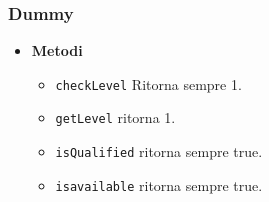 \subsubsection{Dummy}
\begin{itemize}
    \item \textbf{Metodi}
    \begin{itemize}
        \item \texttt{checkLevel} Ritorna sempre 1.
        \item \texttt{getLevel} ritorna 1.
        \item \texttt{isQualified} ritorna sempre true.
        \item \texttt{is\textunderscore available} ritorna sempre true.
    \end{itemize}
\end{itemize}

